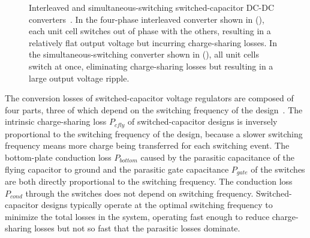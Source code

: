 \documentclass[graybox]{svmult}
\begin{document}
\begin{figure}
\begin{subfigure}[t]{0.42\textwidth}
  \caption{}
  \label{fig:3-simultaneous-switching-b}
  \end{subfigure}
  \hspace*{\fill}
  \caption{Interleaved and simultaneous-switching switched-capacitor DC-DC converters~\cite{Zimmer2016}.  In the four-phase interleaved converter shown in (), each unit cell switches out of phase with the others, resulting in a relatively flat output voltage but incurring charge-sharing losses.  In the simultaneous-switching converter shown in (), all unit cells switch at once, eliminating charge-sharing losses but resulting in a large output voltage ripple.}
  \label{fig:3-simultaneous-switching}
\end{figure}

The conversion losses of switched-capacitor voltage regulators are composed of four parts, three of which depend on the switching frequency of the design~\cite{Le2011}.
The intrinsic charge-sharing loss $P_{cfly}$ of switched-capacitor designs is inversely proportional to the switching frequency of the design, because a slower switching frequency means more charge being transferred for each switching event.
The bottom-plate conduction loss $P_{bottom}$ caused by the parasitic capacitance of the flying capacitor to ground and the parasitic gate capacitance $P_{gate}$ of the switches are both directly proportional to the switching frequency.
The conduction loss $P_{cond}$ through the switches does not depend on switching frequency.
Switched-capacitor designs typically operate at the optimal switching frequency to minimize the total losses in the system, operating fast enough to reduce charge-sharing losses but not so fast that the parasitic losses dominate.

\end{document}
